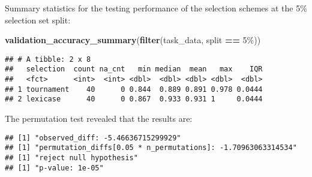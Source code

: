 \documentclass[
]{book}
\newenvironment{Shaded}{\begin{snugshade}}{\end{snugshade}}
\newcommand{\AttributeTok}[1]{\textcolor[rgb]{0.13,0.29,0.53}{#1}}
\newcommand{\DecValTok}[1]{\textcolor[rgb]{0.00,0.00,0.81}{#1}}
\newcommand{\FunctionTok}[1]{\textcolor[rgb]{0.13,0.29,0.53}{\textbf{#1}}}
\newcommand{\NormalTok}[1]{#1}
\newcommand{\OtherTok}[1]{\textcolor[rgb]{0.56,0.35,0.01}{#1}}
\newcommand{\SpecialCharTok}[1]{\textcolor[rgb]{0.81,0.36,0.00}{\textbf{#1}}}
\newcommand{\StringTok}[1]{\textcolor[rgb]{0.31,0.60,0.02}{#1}}
\begin{document}
Summary statistics for the testing performance of the selection schemes at the 5\% selection set split:

\begin{Shaded}
\begin{Highlighting}[]
\FunctionTok{validation\_accuracy\_summary}\NormalTok{(}\FunctionTok{filter}\NormalTok{(task\_data, split }\SpecialCharTok{==} \StringTok{\textquotesingle{}5\%\textquotesingle{}}\NormalTok{))}
\end{Highlighting}
\end{Shaded}

\begin{verbatim}
## # A tibble: 2 x 8
##   selection  count na_cnt   min median  mean   max    IQR
##   <fct>      <int>  <int> <dbl>  <dbl> <dbl> <dbl>  <dbl>
## 1 tournament    40      0 0.844  0.889 0.891 0.978 0.0444
## 2 lexicase      40      0 0.867  0.933 0.931 1     0.0444
\end{verbatim}

The permutation test revealed that the results are:

\begin{Shaded}
\end{Shaded}

\begin{verbatim}
## [1] "observed_diff: -5.46636715299929"
## [1] "permutation_diffs[0.05 * n_permutations]: -1.70963063314534"
## [1] "reject null hypothesis"
## [1] "p-value: 1e-05"
\end{verbatim}
\end{document}
